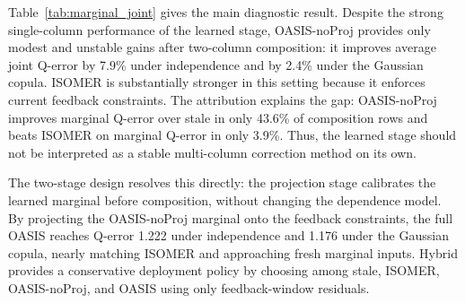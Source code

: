 \documentclass[preprint,12pt]{elsarticle}
\begin{document}
\begin{table}[t]
  \centering
  \small
  \caption{Marginal-to-joint composition: average Q-error ($\downarrow$) for
  two-column range predicates. Values average configuration-level geometric
  means over 20 correlation/drift settings. OASIS is the full two-stage system;
  OASIS-noProj is the learned stage without the feedback-consistency projection;
  Hybrid uses only feedback-window residuals for selection.}
  \label{tab:marginal_joint}
  \setlength{\tabcolsep}{4pt}
\end{table}

Table~\ref{tab:marginal_joint} gives the main diagnostic result. Despite the
strong single-column performance of the learned stage, OASIS-noProj provides only
modest and unstable gains after two-column composition: it improves average joint
Q-error by 7.9\% under independence and by 2.4\% under the Gaussian copula. ISOMER
is substantially stronger in this setting because it enforces current feedback
constraints. The attribution explains the gap: OASIS-noProj improves marginal
Q-error over stale in only 43.6\% of composition rows and beats ISOMER on marginal
Q-error in only 3.9\%. Thus, the learned stage should not be interpreted as a
stable multi-column correction method on its own.

The two-stage design resolves this directly: the projection stage calibrates the
learned marginal before composition, without changing the dependence model. By
projecting the OASIS-noProj marginal onto the feedback constraints, the full
OASIS reaches Q-error 1.222 under independence and 1.176 under the Gaussian
copula, nearly matching ISOMER and approaching fresh marginal inputs. Hybrid
provides a conservative deployment policy by choosing among stale, ISOMER,
OASIS-noProj, and OASIS using only feedback-window residuals.
\end{document}
